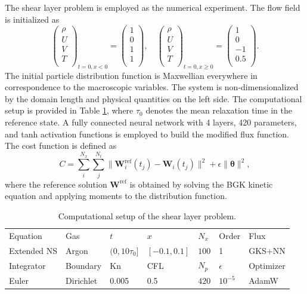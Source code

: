 \documentclass[preprint,3p,12pt,sort&compress]{elsarticle}
\begin{document}
The shear layer problem is employed as the numerical experiment. 
The flow field is initialized as
\begin{equation}
    \left(\begin{array}{c}
    \rho \\
    U \\
    V \\
    T \\
    \end{array}\right)_{{t=0,x<0}}=\left(\begin{array}{c}
    1 \\
    0 \\
    1 \\
    1 \\
    \end{array}\right), \quad 
    \left(\begin{array}{c}
    \rho \\
    U \\
    V \\
    T \\
    \end{array}\right)_{{t=0,x\ge 0}}=\left(\begin{array}{c}
    1 \\
    0 \\
    -1 \\
    0.5 \\
    \end{array}\right).
\end{equation}
The initial particle distribution function is Maxwellian everywhere in correspondence to the macroscopic variables.
The system is non-dimensionalized by the domain length and physical quantities on the left side.
The computational setup is provided in Table \ref{tab:layer},
where $\tau_0$ denotes the mean relaxation time in the reference state.
A fully connected neural network with 4 layers, 420 parameters, and tanh activation functions is employed to build the modified flux function.
The cost function is defined as
\begin{equation}
    C = \sum_i^{N_x}\sum_j^{N_t} \|\mathbf W_{i}^{\mathrm{ref}}(t_j)-\mathbf W_{i}(t_j)\|^2 + \epsilon \|\boldsymbol{\theta}\|^2,
\end{equation}
where the reference solution $\mathbf W^\mathrm{ref}$ is obtained by solving the BGK kinetic equation and applying moments to the distribution function.

\begin{table}[htbp]
    \caption{Computational setup of the shear layer problem.} 
    \centering
    \begin{tabular}{lllllll} 
        \hline
        Equation & Gas & $t$ & $x$ & $N_x$ & Order & Flux \\ 
        Extended NS & Argon & $(0,10\tau_0]$ & $[-0.1,0.1]$ & $100$ & 1 & GKS+NN \\ 
        \hline
        Integrator & Boundary & Kn & CFL & $N_p$ & $\epsilon$ & Optimizer \\
        Euler & Dirichlet & 0.005 & 0.5 & $420$ & $10^{-5}$ & AdamW \\
        \hline
    \end{tabular} 
    \label{tab:layer}
\end{table}
\end{document}
